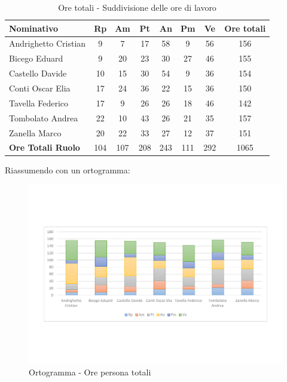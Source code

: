 \documentclass[../PianoProgetto.tex]{subfiles}
\begin{document}
	\begin{table}[h]
		\begin{tabularx}{\textwidth}{l  * {6}{C}  c}
			\toprule
			\textbf{Nominativo} & \textbf{Rp} & \textbf{Am} & \textbf{Pt} 
						& \textbf{An} & \textbf{Pm} & \textbf{Ve} & \textbf{Ore totali} \\
			\midrule
			Andrighetto Cristian & 9 & 7 & 17 & 58 & 9 & 56 &	156 \\
			Bicego Eduard & 9 & 20 & 23 & 30 & 27 & 46 & 155 \\
			Castello Davide & 10 & 15 & 30 & 54 & 9 & 36 & 154 \\
			Conti Oscar Elia & 17 & 24 & 36 & 22 & 15 & 36 & 150 \\
			Tavella Federico &	17 & 9 & 26 & 26 & 18 & 46 & 142 \\
			Tombolato Andrea & 22 & 10 & 43 & 26 & 21 & 35 & 157 \\
			Zanella Marco & 20 & 22 & 33 & 27 & 12 & 37 & 151 \\
			\midrule			
			\textbf{Ore Totali Ruolo} & 104 & 107 & 208 & 243 & 111 & 292 & 1065 \\
			\bottomrule
		\end{tabularx}
		\caption{Ore totali - Suddivisione delle ore di lavoro}
		\label{tab:totale_ore}
	\end{table}
	
\newpage
\vfill
	Riassumendo con un ortogramma:
	
	\begin{figure}[!h]
		\centering
		\includegraphics[width=\textwidth , trim=2cm 5cm 2cm 5cm]{grafici/Riepilogo/Totali/ore-persona}
			\caption{Ortogramma - Ore persona totali}
		\label{fig:BarChart-totale_ore}
	\end{figure}
	
\end{document}
